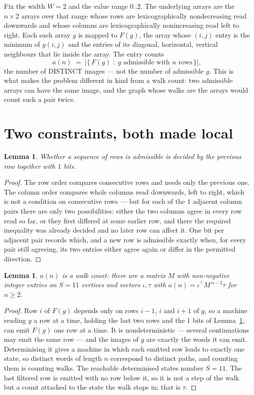 \documentclass[11pt,a4paper]{article}
\theoremstyle{plain}
\newtheorem{lemma}[theorem]{Lemma}
\theoremstyle{definition}
\begin{document}
Fix the width $W=2$ and the value range $0..2$. The underlying arrays are the
$n\times2$ arrays over that range whose rows are lexicographically nondecreasing read downwards
and whose columns are lexicographically nonincreasing read left to right. Each such array $g$
is mapped to $F(g)$, the array whose $(i,j)$ entry is the minimum of $g(i,j)$ and the entries
of its diagonal, horizontal, vertical neighbours that lie inside the array. The entry counts
\[
a(n)\;=\;\bigl|\{\,F(g)\;:\;g\text{ admissible with }n\text{ rows}\,\}\bigr|,
\]
the number of DISTINCT images --- not the number of admissible $g$. This is what makes the
problem different in kind from a walk count: two admissible arrays can have the same image, and
the graph whose walks are the arrays would count such a pair twice.

\section{Two constraints, both made local}

\begin{lemma}\label{lem:local}
Whether a sequence of rows is admissible is decided by the previous row together with
$1$ bits.
\end{lemma}

\begin{proof}
The row order compares consecutive rows and needs only the previous one. The column order
compares whole columns read downwards, left to right, which is not a condition on consecutive
rows --- but for each of the $1$ adjacent column pairs there are only two possibilities:
either the two columns agree in every row read so far, or they first differed at some earlier
row, and there the required inequality was already decided and no later row can affect it. One
bit per adjacent pair records which, and a new row is admissible exactly when, for every pair
still agreeing, its two entries either agree again or differ in the permitted direction.
\end{proof}

\begin{lemma}\label{lem:det}
$a(n)$ is a walk count: there are a matrix $M$ with non-negative integer entries on $S=11$
vertices and vectors $\iota,\tau$ with $a(n)=\iota^{\!\top}M^{\,n-2}\tau$ for $n\ge2$.
\end{lemma}

\begin{proof}
Row $i$ of $F(g)$ depends only on rows $i-1$, $i$ and $i+1$ of $g$, so a machine reading $g$ a
row at a time, holding the last two rows and the $1$ bits of Lemma~\ref{lem:local}, can
emit $F(g)$ one row at a time. It is nondeterministic --- several continuations may emit the
same row --- and the images of $g$ are exactly the words it can emit. Determinising it gives a
machine in which each emitted row leads to exactly one state, so distinct words of length $n$
correspond to distinct paths, and counting them is counting walks. The reachable determinised
states number $S=11$. The last filtered row is emitted with no row below it, so it is not a
step of the walk but a count attached to the state the walk stops in; that is $\tau$.
\end{proof}
\end{document}
